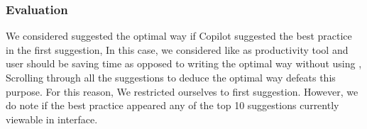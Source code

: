 \subsubsection{Evaluation}
\label{smells:evaluation}
We considered \cop{} suggested the optimal way if Copilot suggested the best practice in the first suggestion, In this case, we considered \cct{} like \cop{} as productivity tool and user should be saving time as opposed to writing the optimal way without using \cct{}, Scrolling through all the suggestions to deduce the optimal way defeats this purpose. For this reason, We restricted ourselves to first suggestion. However, we do note if the best practice appeared any of the top 10 suggestions currently viewable in \cop{} interface. 


